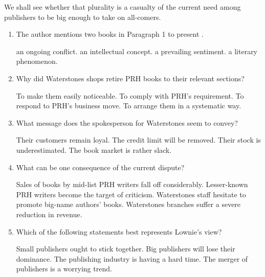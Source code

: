 We shall see whether that plurality is a casualty of the current need among publishers to be big enough to take on all-comers.

\begin{enumerate}[resume]

\item

The author mentions two books in Paragraph 1 to present \lineread.

\fourchoices
{an ongoing conflict.}
{an intellectual concept.}
{a prevailing sentiment.}
{a literary phenomenon.}

\item

Why did Waterstones shops retire PRH books to their relevant sections?

\fourchoices
{To make them easily noticeable.}
{To comply with PRH's requirement.}
{To respond to PRH's business move.}
{To arrange them in a systematic way.}

\item

What message does the spokesperson for Waterstones seem to convey?

\fourchoices
{Their customers remain loyal.}
{The credit limit will be removed.}
{Their stock is underestimated.}
{The book market is rather slack.}

\item

What can be one consequence of the current dispute?

\fourchoices
{Sales of books by mid-list PRH writers fall off considerably.}
{Lesser-known PRH writers become the target of criticism.}
{Waterstones staff hesitate to promote big-name authors' books.}
{Waterstones branches suffer a severe reduction in revenue.}

\item

Which of the following statements best represents Lownie's view?

\fourchoices
{Small publishers ought to stick together.}
{Big publishers will lose their dominance.}
{The publishing industry is having a hard time.}
{The merger of publishers is a worrying trend.}

\end{enumerate}


